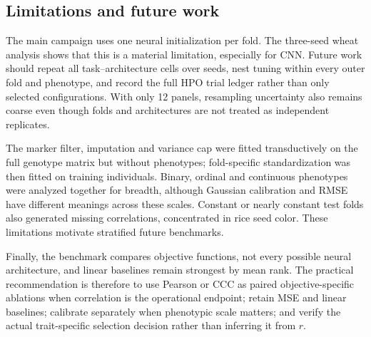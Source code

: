 \subsection{Limitations and future work}
The main campaign uses one neural initialization per fold. The three-seed wheat
analysis shows that this is a material limitation, especially for CNN. Future
work should repeat all task--architecture cells over seeds, nest tuning within
every outer fold and phenotype, and record the full HPO trial ledger rather than
only selected configurations. With only 12 panels, resampling uncertainty also
remains coarse even though folds and architectures are not treated as independent
replicates.

The marker filter, imputation and variance cap were fitted transductively on the
full genotype matrix but without phenotypes; fold-specific standardization was
then fitted on training individuals. Binary, ordinal and continuous phenotypes
were analyzed together for breadth, although Gaussian calibration and RMSE have
different meanings across these scales. Constant or nearly constant test folds
also generated missing correlations, concentrated in rice seed color. These
limitations motivate stratified future benchmarks.

Finally, the benchmark compares objective functions, not every possible neural
architecture, and linear baselines remain strongest by mean rank. The practical
recommendation is therefore to use Pearson or CCC as paired objective-specific
ablations when correlation is the operational endpoint; retain MSE and linear
baselines; calibrate separately when phenotypic scale matters; and verify the
actual trait-specific selection decision rather than inferring it from $r$.

